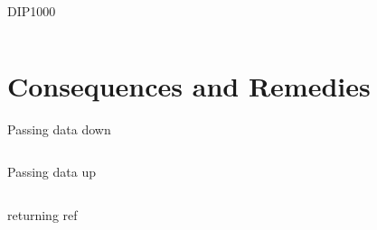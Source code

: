 \documentclass[aspectratio=169,notes]{beamer}
\begin{document}
	\begin{frame}[fragile]{DIP1000}
		\begin{columns}[T]
		\begin{column}{0.49\textwidth}
		
		\end{column}
		\begin{column}{0.49\textwidth}
		
		\end{column}
		\end{columns}
	\end{frame}

	\section{Consequences and Remedies}

	\begin{frame}[fragile]{Passing data down}
		\begin{columns}[T]
		\begin{column}{0.49\textwidth}
		
		\end{column}
		\pause
		\begin{column}{0.49\textwidth}
		
		\end{column}
		\end{columns}
	\end{frame}

	\begin{frame}[fragile]{Passing data up}
		\begin{columns}[T]
		\begin{column}{0.49\textwidth}
		
		\end{column}
		\pause
		\begin{column}{0.49\textwidth}
		
		\end{column}
		\end{columns}
	\end{frame}

	\begin{frame}[fragile]{returning ref}
		\begin{columns}[T]
		\begin{column}{0.49\textwidth}
		
		\end{column}
		\pause
		\begin{column}{0.49\textwidth}
		
		\end{column}
		\end{columns}
	\end{frame}
\end{document}
